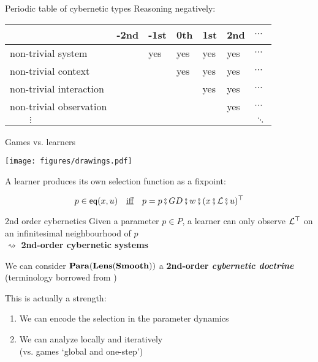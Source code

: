 \begin{frame}{Periodic table of cybernetic types}
	\vspace{-2ex}
	Reasoning negatively:
	\vspace{2ex}

	\vfill
	\begin{tabular}{p{}|p{}p{}p{}p{}p{}p{}}
		& \textbf{-2nd} & \textbf{-1st} & \textbf{0th} & \textbf{1st} & \textbf{2nd} & $\cdots$\\
		\hline
		{\color{coloraccent}non-trivial system}      &     & yes & yes & yes & yes & $\cdots$\\[2ex]
		\hline
		{\color{coloraccent}non-trivial context}     &     &     & yes & yes & yes & $\cdots$\\[2ex]
		\hline
		{\color{coloraccent}non-trivial interaction} &     &     &     & yes & yes & $\cdots$\\[2ex]
		\hline
		non-trivial observation                      &     &     &     &     & yes & $\cdots$\\[2ex]
		\hline
		$\qquad \vdots$                              &     &     &     &     &     & $\ddots$
	\end{tabular}
\end{frame}

\begin{frame}{Games vs. learners}
	\begin{center}
		\texttt{[image: figures/drawings.pdf]}
	\end{center}

	\vfill
	A learner produces its own selection function as a fixpoint:

	\begin{equation*}
		p \in \mathsf{eq}(x,u) \quad\text{\underline{iff}}\quad p = p \fatsemi GD \fatsemi w \fatsemi (x \fatsemi \mathcal{L} \fatsemi u)^\top
	\end{equation*}
\end{frame}

\begin{frame}{2nd order cybernetics}
	Given a parameter $p \in P$, a learner can only observe $\mathcal{L}^\top$ on an infinitesimal neighbourhood of $p$\\
	\qquad $\rightsquigarrow$ \textbf{2nd-order cybernetic systems}

	\vfill
	We can consider $\mathbf{Para}(\mathbf{Lens}(\mathbf{Smooth}))$ a \textbf{2nd-order \emph{cybernetic doctrine}} (terminology borrowed from \cite{myers2021cst})

	\vfill
	This is actually a strength:
	\begin{enumerate}
		\item We can encode the selection in the parameter dynamics
		\item We can analyze locally and iteratively\\(vs. games `global and one-step')
	\end{enumerate}
\end{frame}
